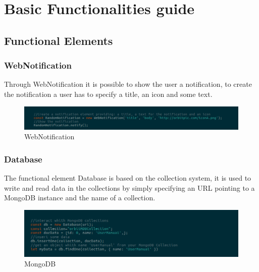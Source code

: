 \section{Basic Functionalities guide}
\subsection{Functional Elements}


\subsubsection{WebNotification}
Through WebNotification it is possible to show the user a notification, to create the notification a user has to specify a title, an icon and some text. 
\begin{figure}[H]
	\centering
	\includegraphics[width=14cm]{../../documenti/UserManualFramework/framework_model/2framework_model_notification.png}
	\caption{WebNotification}
\end{figure}

\subsubsection{Database}
The functional element Database is based on the  collection system, it is used to write and read data in the collections by simply specifying an URL pointing to a MongoDB instance and the name of a collection.
\begin{figure}[H]
	\centering
	\includegraphics[width=14cm]{../../documenti/UserManualFramework/framework_model/3framework_model_mongo.png}
	\caption{MongoDB}
\end{figure}

